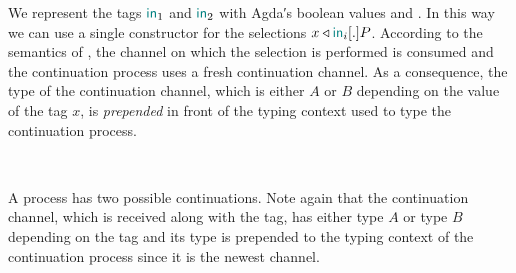 \begin{AgdaAlign}
We represent the tags $\mathsf{\color{teal}in}_1$ and $\mathsf{\color{teal}in}_2$ with Agda′s boolean values
 and . In this
way we can use a single constructor  for the
selections $\Select\x{\InTag_i}.P$. According to the semantics of \Calculus, the
channel on which the selection is performed is consumed and the continuation
process uses a fresh continuation channel. As a consequence, the type of the
continuation channel, which is either $A$ or $B$ depending on the value of the
tag $x$, is \emph{prepended} in front of the typing context used to type the
continuation process.

\begin{code}%
%
\>[3]%
\>[13]\AgdaSymbol{:}%
\>[1557I]\AgdaSpace{}%
\AgdaSpace{}%
\AgdaSpace{}%
\AgdaSymbol{\}}\AgdaSpace{}%
\AgdaSymbol{(}\AgdaSpace{}%
\AgdaSymbol{:}\AgdaSpace{}%
\AgdaSpace{}%
\AgdaSpace{}%
\AgdaSpace{}%
\AgdaOperator{\AgdaInductiveConstructor{\&}}\AgdaSpace{}%
\AgdaSpace{}%
\AgdaOperator{\AgdaFunction{,}}\AgdaSpace{}%
\AgdaSymbol{)}\AgdaSpace{}%
\<%
\\
\>[.][@{}l@{}]\<[1557I]%
\>[15]\AgdaSpace{}%
\AgdaSymbol{(}\AgdaSpace{}%
\AgdaSpace{}%
\AgdaSymbol{)}\AgdaSpace{}%
\AgdaSpace{}%
\AgdaSpace{}%
\AgdaSymbol{(}\AgdaSpace{}%
\AgdaSpace{}%
\AgdaSymbol{)}\AgdaSpace{}%
\AgdaSpace{}%
\AgdaSpace{}%
\<%
\end{code}

A  process has two possible continuations. Note
again that the continuation channel, which is received along with the tag, has
either type $A$ or type $B$ depending on the tag and its type is prepended to
the typing context of the continuation process since it is the newest channel.


\end{AgdaAlign}
